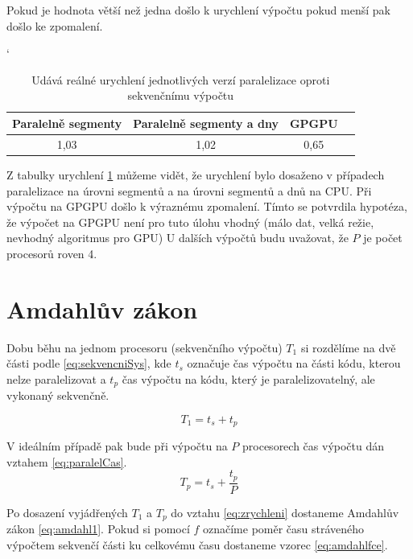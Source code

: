 \documentclass{article}
\begin{document}
	\par Pokud je hodnota větší než jedna došlo k urychlení výpočtu pokud menší pak došlo ke zpomalení.
	
	\begin{table}[h]
	\centering
	\catcode`
	\def\arraystretch{1.2}
	\begin{tabular}{|c|c|c|c|}
	\hline
	\textbf{Paralelně segmenty} &  \textbf{Paralelně segmenty a dny} & \textbf{GPGPU}  \\ \hline
	\hline
	1,03                  & 1,02     		  &        0,65                 \\ \hline
	
	\end{tabular}
	\caption{Udává reálné urychlení jednotlivých verzí paralelizace oproti sekvenčnímu výpočtu}
	\label{tab:zrychleni}
	\end{table}
	
	\par Z tabulky urychlení \ref{tab:zrychleni} můžeme vidět, že urychlení bylo dosaženo v případech paralelizace na úrovni segmentů a na úrovni segmentů a dnů na CPU. Při výpočtu na GPGPU došlo k výraznému zpomalení. Tímto se potvrdila hypotéza, že výpočet na GPGPU není pro tuto úlohu vhodný (málo dat, velká režie, nevhodný algoritmus pro GPU) U dalších výpočtů budu uvažovat, že $P$ je počet procesorů roven 4.
	
	\section{Amdahlův zákon}
	\par Dobu běhu na jednom procesoru (sekvenčního výpočtu) $T_{1}$ si rozdělíme na dvě části podle \ref{eq:sekvencniSys}, kde $t_{s}$ označuje čas výpočtu na části kódu, kterou nelze paralelizovat a $ t_{p}$ čas výpočtu na kódu, který je paralelizovatelný, ale vykonaný sekvenčně. 
	
	\begin{equation} 
	T_{1} = t_{s} + t_{p}   
	\label{eq:sekvencniSys}
	\end{equation}
	
	V ideálním případě pak bude při výpočtu na $P$ procesorech čas výpočtu dán vztahem \ref{eq:paralelCas}.
	\begin{equation} 
	T_{p} = t_{s} + \frac{t_{p}}{P}   
	\label{eq:paralelCas}
	\end{equation}
	
	Po dosazení vyjádřených $T_{1}$ a $T_{p}$ do vztahu \ref{eq:zrychleni} dostaneme Amdahlův zákon \ref{eq:amdahl1}. Pokud si pomocí $f$ označíme poměr času stráveného výpočtem sekvenčí části ku celkovému času dostaneme vzorec \ref{eq:amdahlfce}.
	
\end{document}
